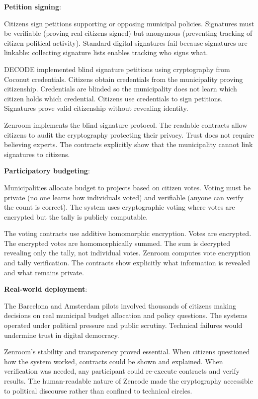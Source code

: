 \textbf{Petition signing}:

Citizens sign petitions supporting or opposing municipal
policies. Signatures must be verifiable (proving real citizens signed)
but anonymous (preventing tracking of citizen political
activity). Standard digital signatures fail because signatures are
linkable: collecting signature lists enables tracking who signs what.

DECODE implemented blind signature petitions using cryptography from
Coconut credentials. Citizens obtain credentials from the municipality
proving citizenship. Credentials are blinded so the municipality does
not learn which citizen holds which credential. Citizens use
credentials to sign petitions. Signatures prove valid citizenship
without revealing identity.

Zenroom implements the blind signature protocol. The readable
contracts allow citizens to audit the cryptography protecting their
privacy. Trust does not require believing experts. The contracts
explicitly show that the municipality cannot link signatures to
citizens.

\textbf{Participatory budgeting}:

Municipalities allocate budget to projects based on citizen
votes. Voting must be private (no one learns how individuals voted)
and verifiable (anyone can verify the count is correct). The system
uses cryptographic voting where votes are encrypted but the tally is
publicly computable.

The voting contracts use additive homomorphic encryption. Votes are
encrypted. The encrypted votes are homomorphically summed. The sum is
decrypted revealing only the tally, not individual votes. Zenroom
computes vote encryption and tally verification. The contracts show
explicitly what information is revealed and what remains private.

\textbf{Real-world deployment}:

The Barcelona and Amsterdam pilots involved thousands of citizens
making decisions on real municipal budget allocation and policy
questions. The systems operated under political pressure and public
scrutiny. Technical failures would undermine trust in digital
democracy.

Zenroom's stability and transparency proved essential. When citizens
questioned how the system worked, contracts could be shown and
explained. When verification was needed, any participant could
re-execute contracts and verify results. The human-readable nature of
Zencode made the cryptography accessible to political discourse rather
than confined to technical circles.

